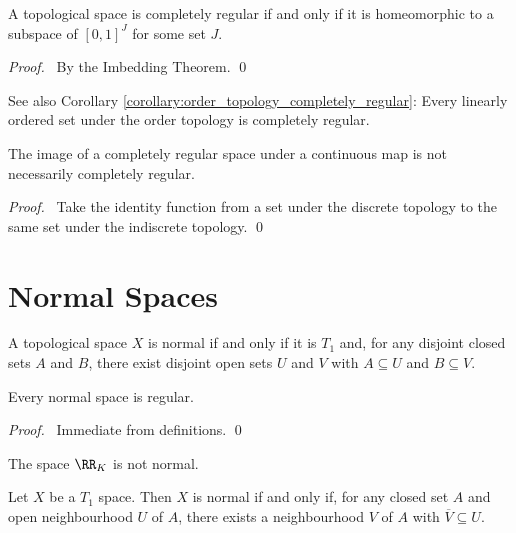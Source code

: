 \begin{theorem}
    \label{theorem:completely_regular_embedded_in_IJ}
    A topological space is completely regular if and only if it is homeomorphic to
    a subspace of $[0,1]^J$ for some set $J$.
\end{theorem}

\begin{proof}
    \pf\ By the Imbedding Theorem. \qed
\end{proof}

See also Corollary \ref{corollary:order_topology_completely_regular}: Every linearly ordered set under the
order topology is completely regular.

\begin{proposition}
    The image of a completely regular space under a continuous map is
    not necessarily completely regular.
\end{proposition}

\begin{proof}
    \pf\ Take the identity function from a set under the
    discrete topology to the same set under the indiscrete topology. \qed
\end{proof}

\section{Normal Spaces}

\begin{definition}[Normal]
    A topological space $X$ is normal if and only if it is $T_1$ and, for any
    disjoint closed sets $A$ and $B$, there exist disjoint open sets $U$ and $V$
    with $A \subseteq U$ and $B \subseteq V$.
\end{definition}

\begin{proposition}
    Every normal space is regular.
\end{proposition}

\begin{proof}
    \pf\ Immediate from definitions. \qed
\end{proof}

\begin{corollary}
    The space $\RR_K$ is not normal.
\end{corollary}

\begin{proposition}
    \label{proposition:normal_neighbourhoods}
    Let $X$ be a $T_1$ space. Then $X$ is normal if and only if, for any closed
    set $A$ and open neighbourhood $U$ of $A$, there exists a neighbourhood
    $V$ of $A$ with $\overline{V} \subseteq U$.
\end{proposition}

